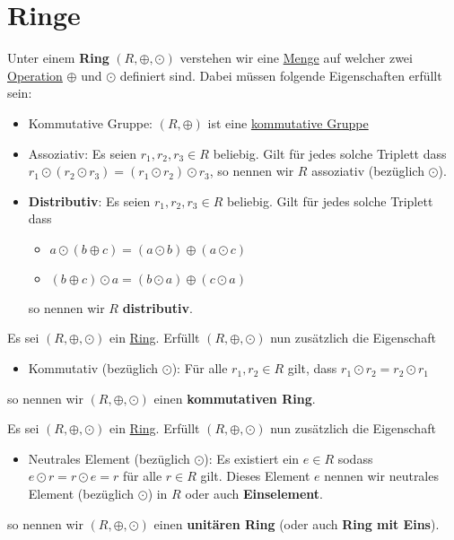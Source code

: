 \documentclass[../../main.tex]{subfiles}
\begin{document}
		\section{Ringe}
		\begin{definition}
			\label{def:Ring}
			\label{def:distributiv}
			Unter einem \textbf{Ring} $(R, \oplus, \odot)$ verstehen wir eine \hyperref[def:Menge]{Menge} auf welcher zwei \hyperref[def:Operation]{Operation} $\oplus$ und $\odot$ definiert sind. Dabei müssen folgende Eigenschaften erfüllt sein: 
			\begin{itemize}
				\item Kommutative Gruppe: $(R, \oplus)$ ist eine \hyperref[def:kommutativeGruppe]{kommutative Gruppe}
				\item Assoziativ: Es seien $r_1, r_2, r_3 \in R$ beliebig. Gilt für jedes solche Triplett dass $r_1 \odot (r_2 \odot r_3) = (r_1 \odot r_2) \odot r_3$, so nennen wir $R$ assoziativ (bezüglich $\odot$). 
				\item \textbf{Distributiv}: Es seien $r_1, r_2, r_3 \in R$ beliebig. Gilt für jedes solche Triplett dass 
				\begin{itemize}
					\item $a \odot (b \oplus c) = (a \odot b) \oplus (a \odot c)$
					\item $(b \oplus c) \odot a = (b \odot a) \oplus (c \odot a)$
				\end{itemize}
				so nennen wir $R$ \textbf{distributiv}.
			\end{itemize}
		\end{definition}
	
		\begin{definition}
			\label{def:kommutativerRing}
			Es sei $(R, \oplus, \odot)$ ein \hyperref[def:Ring]{Ring}. Erfüllt $(R, \oplus, \odot)$ nun zusätzlich die Eigenschaft 
			\begin{itemize}
				\item Kommutativ (bezüglich $\odot$): Für alle $r_1,r_2 \in R$ gilt, dass $r_1 \odot r_2 = r_2 \odot r_1$
			\end{itemize}
			so nennen wir $(R, \oplus, \odot)$ einen \textbf{kommutativen Ring}.
		\end{definition}		
		
		\begin{definition}
			\label{def:unitärerRing}
			\label{def:RingMitEins}
			\label{def:Einselement}
			Es sei $(R, \oplus, \odot)$ ein \hyperref[def:Ring]{Ring}. Erfüllt $(R, \oplus, \odot)$ nun zusätzlich die Eigenschaft
			\begin{itemize}
				\item Neutrales Element (bezüglich $\odot$): Es existiert ein $e \in R$ sodass $e \odot r = r \odot e = r$ für alle $r\in R$ gilt. Dieses Element $e$ nennen wir neutrales Element (bezüglich $\odot$) in $R$ oder auch \textbf{Einselement}.
			\end{itemize}
			so nennen wir $(R, \oplus, \odot)$ einen \textbf{unitären Ring} (oder auch \textbf{Ring mit Eins}).
		\end{definition}
	
\end{document}
